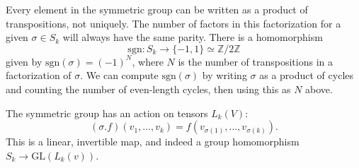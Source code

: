 Every element in the symmetric group can be written as a product of
transpositions, not uniquely. The number of factors in this
factorization for a given $\sigma \in S_k$ will always have the same
parity. There is a homomorphism
$$
       \mathrm{sgn} : S_k
\to    \{-1, 1\}
\simeq \mathbb{Z} / 2\mathbb{Z}
$$
given by $\mathrm{sgn}(\sigma) = (-1)^{N}$, where $N$ is the number of
transpositions in a factorization of $\sigma$. We can compute
$\mathrm{sgn}(\sigma)$ by writing $\sigma$ as a product of cycles and
counting the number of even-length cycles, then using this as $N$
above.

The symmetric group has an action on tensors $L_k(V)$:
$$
  (\sigma . f)(v_1, \dots, v_k)
= f(v_{\sigma(1)}, \dots, v_{\sigma(k)}).
$$
This is a linear, invertible map, and indeed a group homomorphism
$S_k \to \mathrm{GL}(L_k(v))$.